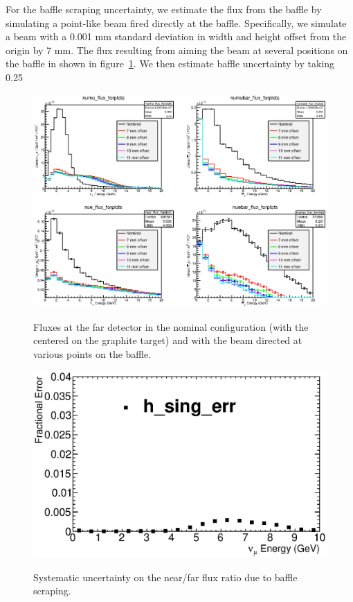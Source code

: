 For the baffle scraping uncertainty, we estimate the flux from the baffle by simulating a point-like beam fired directly at the baffle. Specifically, we simulate a beam with a 0.001 mm standard deviation in width and height offset from the origin by 7 mm.  The flux resulting from aiming the beam at several positions on the baffle in shown in figure~\ref{fig:baffle_flux}.  We then estimate baffle uncertainty by taking 0.25%

\begin{figure}[ht]
\label{fig:baffle_flux}
  \begin{center}
    {\includegraphics[width=6.0in]{figures/baffle_flux.eps}}
  \end{center}
\caption{ Fluxes at the far detector in the nominal configuration (with the centered on the graphite target) and with the beam directed at various points on the baffle. }
\end{figure}

\begin{figure}[ht]
\label{fig:baffle_error}
  \begin{center}
    {\includegraphics[width=6.0in]{figures/BeamOffsetX7Sigma0pnt001_nof_error.eps}}
  \end{center}
\caption{ Systematic uncertainty on the near/far flux ratio due to baffle scraping. }
\end{figure}


